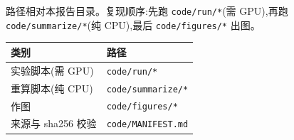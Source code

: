 \documentclass[fontset=none,10.5pt]{ctexart}
\begin{document}
\begin{sloppypar}
路径相对本报告目录。复现顺序:先跑 \texttt{code/run/*}(需 GPU),再跑 \texttt{code/summarize/*}(纯 CPU),最后 \texttt{code/figures/*} 出图。
\end{sloppypar}

\begin{center}\small
\begin{tabular}{ll}
\toprule
\rowcolor{tabhead}
类别 & 路径\\
\midrule
实验脚本(需 GPU) & \texttt{code/run/*}\\
重算脚本(纯 CPU) & \texttt{code/summarize/*}\\
作图 & \texttt{code/figures/*}\\
来源与 sha256 校验 & \texttt{code/MANIFEST.md}\\
\bottomrule
\end{tabular}
\end{center}
\end{document}
